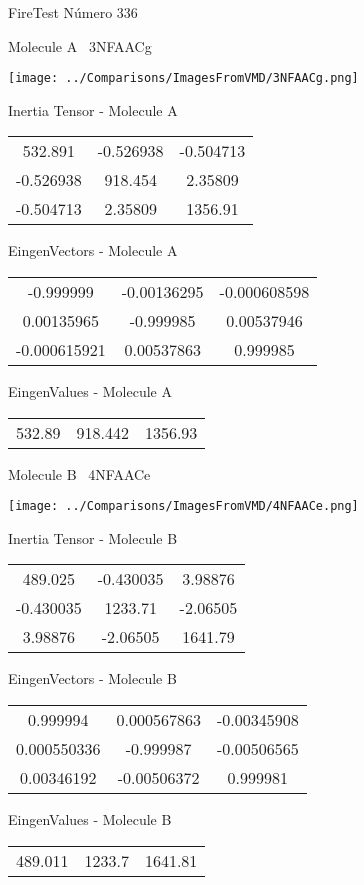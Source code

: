 \vtab[-3cm]
\begin{center}
{\large FireTest \tab Número 336}
\end{center}
\begin{multicols}{2}
\begin{center}

Molecule A \
3NFAACg

\texttt{[image: ../Comparisons/ImagesFromVMD/3NFAACg.png]}

Inertia Tensor - Molecule A \\
\begin{tabular}{|c c c|}
532.891	 & 	-0.526938	 & 	-0.504713	 \\
-0.526938	 & 	918.454	 & 	2.35809	 \\
-0.504713	 & 	2.35809	 & 	1356.91
\end{tabular}

\vtab
 EingenVectors - Molecule A     \\
\begin{tabular}{|c c c|}
-0.999999	 & 	-0.00136295	 & 	-0.000608598	 \\
0.00135965	 & 	-0.999985	 & 	0.00537946	 \\
-0.000615921	 & 	0.00537863	 & 	0.999985
\end{tabular}

\vtab
 EingenValues - Molecule A     \\
\begin{tabular}{|c c c|}
532.89	 & 	918.442	 & 	1356.93	 \\
\end{tabular}
\columnbreak

Molecule B \
4NFAACe

\texttt{[image: ../Comparisons/ImagesFromVMD/4NFAACe.png]}

Inertia Tensor - Molecule B \\
\begin{tabular}{|c c c|}
489.025	 & 	-0.430035	 & 	3.98876	 \\
-0.430035	 & 	1233.71	 & 	-2.06505	 \\
3.98876	 & 	-2.06505	 & 	1641.79
\end{tabular}

\vtab
 EingenVectors - Molecule B     \\
\begin{tabular}{|c c c|}
0.999994	 & 	0.000567863	 & 	-0.00345908	 \\
0.000550336	 & 	-0.999987	 & 	-0.00506565	 \\
0.00346192	 & 	-0.00506372	 & 	0.999981
\end{tabular}

\vtab
 EingenValues - Molecule B     \\
\begin{tabular}{|c c c|}
489.011	 & 	1233.7	 & 	1641.81	 \\
\end{tabular}

\end{center}
\end{multicols}

